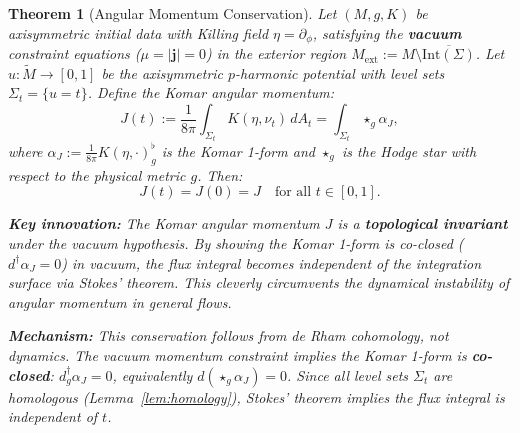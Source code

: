 \documentclass[10pt,a4paper]{amsart}
\newtheorem{theorem}{Theorem}
\newcommand{\momdens}{\boldsymbol{j}}
\newcommand{\tM}{\tilde{M}}
\begin{document}
\begin{theorem}[Angular Momentum Conservation]\label{thm:J-conserve}
Let $(M, g, K)$ be axisymmetric initial data with Killing field $\eta = \partial_\phi$, satisfying the \textbf{vacuum} constraint equations ($\mu = |\momdens| = 0$) in the exterior region $M_{\mathrm{ext}} := M \setminus \overline{\mathrm{Int}(\Sigma)}$. Let $u: \tM \to [0,1]$ be the axisymmetric $p$-harmonic potential with level sets $\Sigma_t = \{u = t\}$. Define the Komar angular momentum:
\[
J(t) := \frac{1}{8\pi}\int_{\Sigma_t} K(\eta, \nu_t) \, dA_t = \int_{\Sigma_t} \star_g \alpha_J,
\]
where $\alpha_J := \frac{1}{8\pi}K(\eta, \cdot)^\flat_g$ is the Komar 1-form and $\star_g$ is the Hodge star with respect to the physical metric $g$. Then:
\[
J(t) = J(0) = J \quad \text{for all } t \in [0, 1].
\]

\textbf{Key innovation:} The Komar angular momentum $J$ is a \textbf{topological invariant} under the vacuum hypothesis. By showing the Komar 1-form is co-closed ($d^\dagger\alpha_J = 0$) in vacuum, the flux integral becomes independent of the integration surface via Stokes' theorem. This cleverly circumvents the dynamical instability of angular momentum in general flows.

\textbf{Mechanism:} This conservation follows from de Rham cohomology, not dynamics. The vacuum momentum constraint implies the Komar 1-form is \textbf{co-closed}: $d^\dagger_g \alpha_J = 0$, equivalently $d(\star_g \alpha_J) = 0$. Since all level sets $\Sigma_t$ are homologous (Lemma~\ref{lem:homology}), Stokes' theorem implies the flux integral is independent of $t$.
\end{theorem}
\end{document}
